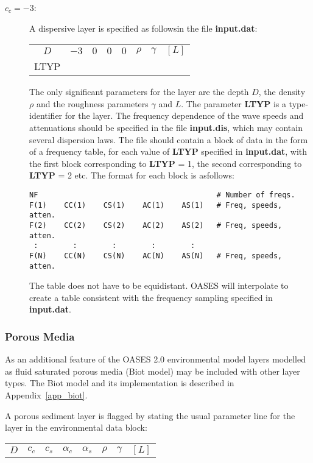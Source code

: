 \begin{description}
\item[$c_c=-3$:] A dispersive layer is specified as followsin the file
{\bf input.dat}:

\begin{tabular}{cccccccc}
    $D$ &    $-3$ & $0$ & $0$ & $0$ &  $\rho$ &
$\gamma$ & $ [L] $ \\	
LTYP & & & & & & &
\end{tabular}

 The only significant parameters for the layer are
the depth $D$, the density $\rho$ and the roughness parameters
$\gamma$ and $L$. The parameter {\bf LTYP} is a type-identifier for
the layer.
The frequency dependence of the
wave speeds and attenuations should be specified in the file {\bf
input.dis}, which may contain several dispersion laws. The file should
contain a block of data in the form of a frequency table, for each value
of {\bf LTYP} specified in {\bf input.dat}, with the first block
corresponding to {\bf LTYP} = 1, the second corresponding to {\bf
LTYP} = 2 etc. The format for each
block is asfollows:

\small
\begin{verbatim}
NF                                         # Number of freqs.
F(1)    CC(1)    CS(1)    AC(1)    AS(1)   # Freq, speeds, atten.
F(2)    CC(2)    CS(2)    AC(2)    AS(2)   # Freq, speeds, atten.
 :        :        :        :        :
F(N)    CC(N)    CS(N)    AC(N)    AS(N)   # Freq, speeds, atten.
\end{verbatim}
\normalsize

The table does not have to be equidistant. OASES will interpolate to
create a table consistent with the frequency sampling specified in
{\bf input.dat}.
\end{description}

\subsubsection{Porous Media}

As an additional feature of the OASES 2.0 environmental model
layers modelled as fluid saturated porous media (Biot model) may be
included with other layer types. The Biot model and its implementation is
described in Appendix~\ref{app_biot}.

A porous sediment layer is flagged by
stating the usual parameter line for the layer in the environmental
data block:

\begin{tabular}{cccccccc}
    $D$ & $c_c$ & $c_s$ & $\alpha_c$ & $\alpha_s$ & $\rho$ &
$\gamma$ & $ [L] $
\end{tabular}

